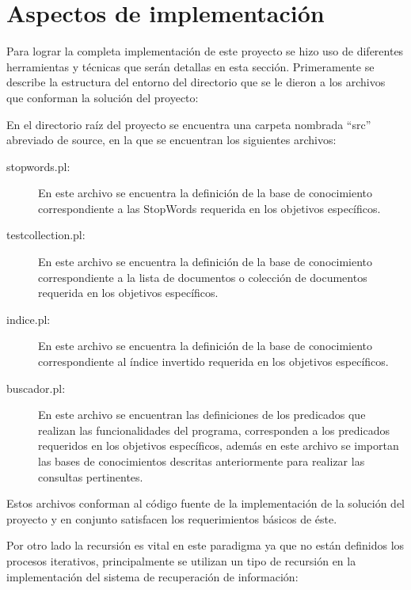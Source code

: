 \documentclass[letterpaper,12pt]{report}
\begin{document}
\section {Aspectos de implementación}

Para lograr la completa implementación de este proyecto se hizo uso de diferentes herramientas y técnicas que serán detallas en esta sección. Primeramente se describe la estructura del entorno del directorio que se le dieron a los archivos que conforman la solución del proyecto:

En el directorio raíz del proyecto se encuentra una carpeta nombrada ``src'' abreviado de source, en la que se encuentran los siguientes archivos:

\begin{description}

    \item [stopwords.pl:]
        En este archivo se encuentra la definición de la base de conocimiento correspondiente a las StopWords requerida en los objetivos específicos.

    \item [testcollection.pl:]
        En este archivo se encuentra la definición de la base de conocimiento correspondiente a la lista de documentos o colección de documentos requerida en los objetivos específicos.

    \item [indice.pl:]
        En este archivo se encuentra la definición de la base de conocimiento correspondiente al índice invertido requerida en los objetivos específicos.

    \item [buscador.pl: ]
        En este archivo se encuentran las definiciones de los predicados que realizan las funcionalidades del programa, corresponden a los predicados requeridos en los objetivos específicos, además en este archivo se importan las bases de conocimientos descritas anteriormente para realizar las consultas pertinentes.

\end{description}

Estos archivos conforman al código fuente de la implementación de la solución del proyecto y en conjunto satisfacen los requerimientos básicos de éste.

Por otro lado la recursión es vital en este paradigma ya que no están definidos los procesos iterativos, principalmente se utilizan un tipo de recursión en la implementación del sistema de recuperación de información:
\end{document}
